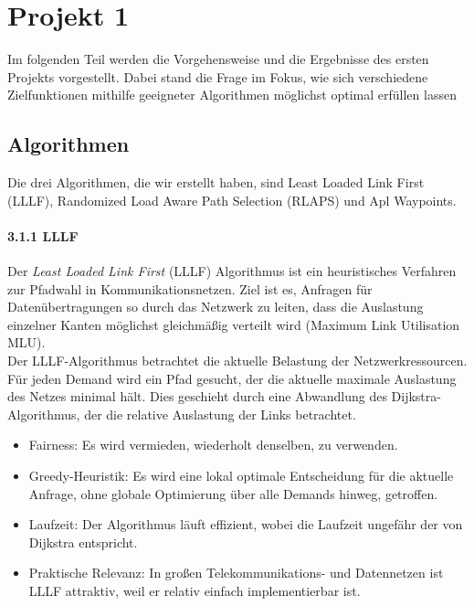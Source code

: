 \documentclass[sigconf,nonacm,review,language=english,language=german]{acmart}
\begin{document}
\section{Projekt 1}
Im folgenden Teil werden die Vorgehensweise und die Ergebnisse des ersten Projekts vorgestellt. Dabei stand die Frage im Fokus, wie sich verschiedene Zielfunktionen mithilfe geeigneter Algorithmen möglichst optimal erfüllen lassen
    \subsection{Algorithmen}
        Die drei Algorithmen, die wir erstellt haben, sind Least Loaded Link First (LLLF), Randomized Load Aware Path Selection (RLAPS) und Apl Waypoints. 
        
        \paragraph{3.1.1   LLLF}
            Der \textit{Least Loaded Link First} (LLLF) Algorithmus ist ein heuristisches Verfahren zur Pfadwahl in Kommunikationsnetzen. Ziel ist es, Anfragen für Datenübertragungen so durch das Netzwerk zu leiten, dass die Auslastung einzelner Kanten möglichst gleichmäßig verteilt wird (Maximum Link Utilisation MLU). \\
            Der LLLF-Algorithmus betrachtet die aktuelle Belastung der Netzwerkressourcen. Für jeden Demand wird ein Pfad gesucht, der die aktuelle maximale Auslastung des Netzes minimal hält. Dies geschieht durch eine Abwandlung des Dijkstra-Algorithmus, der die relative Auslastung der Links betrachtet.
            \begin{itemize}
                \item Fairness: Es wird vermieden, wiederholt denselben, zu verwenden.
                \item Greedy-Heuristik: Es wird eine lokal optimale Entscheidung für die aktuelle Anfrage, ohne globale Optimierung über alle Demands hinweg, getroffen.
                \item Laufzeit: Der Algorithmus läuft effizient, wobei die Laufzeit ungefähr der von Dijkstra entspricht.
                \item Praktische Relevanz: In großen Telekommunikations- und Datennetzen ist LLLF attraktiv, weil er relativ einfach implementierbar ist.
            \end{itemize}
            
                
\end{document}
